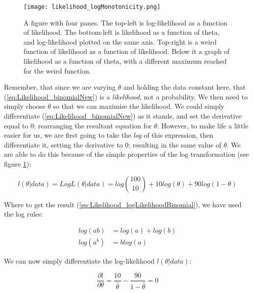 \documentclass[11pt,fullpage]{book}
\begin{document}
\begin{figure}
\centering
\scalebox{0.75} 
{\texttt{[image: likelihood\_logMonotonicity.png]}}
\caption{A figure with four panes. The top-left is log-likelihood as a function of likelihood. The bottom-left is likelihood as a function of theta, and log-likelihood plotted on the same axis. Top-right is a weird function of likelihood as a function of likelihood. Below it a graph of likelihood as a function of theta, with a different maximum reached for the weird function.}\label{fig:Likelihood_logMonotonicity}
\end{figure}

Remember, that since we are varying $\theta$ and holding the data constant here, that (\ref{eq:Likelihood_binomialNew}) is a \textit{likelihood}, not a probability. We then need to simply choose $\theta$ so that we can maximise the likelihood. We could simply differentiate (\ref{eq:Likelihood_binomialNew}) as it stands, and set the derivative equal to 0; rearranging the resultant equation for $\theta$. However, to make life a little easier for us, we are first going to take the \textit{log} of this expression, then differentiate it, setting the derivative to 0; resulting in the same value of $\theta$. We are able to do this because of the simple properties of the log transformation (see figure \ref{fig:Likelihood_logMonotonicity}):

\begin{equation}\label{eq:Likelihood_logLikelihoodBinomial}
l(\theta|data) = Log L(\theta|data) = log{100 \choose 10}+ 10log(\theta)+ 90 log(1-\theta)
\end{equation}

Where to get the result (\ref{eq:Likelihood_logLikelihoodBinomial}), we have used the log rules:

\begin{equation}\label{eq:Likelihood_logRules}
\begin{align}
log(ab) &= log(a) + log(b)\\
log(a^b) &= blog(a)
\end{align}
\end{equation}

We can now simply differentiate the log-likelihood $l(\theta|data)$:

\begin{equation}\label{eq:Likelihood_binomialderiv}
\frac{\partial l}{\partial \theta} = \frac{10}{\hat{\theta}}-\frac{90}{1-\hat{\theta}} = 0
\end{equation}
\end{document}

